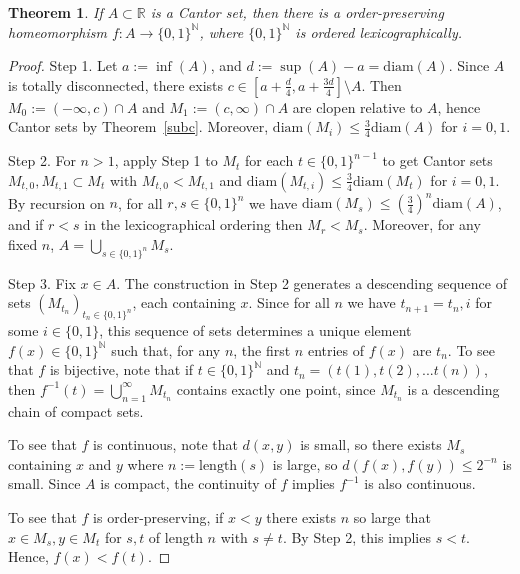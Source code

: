 \documentclass{article}
\newtheorem{theorem}{Theorem}
\newcommand{\length}{\mathrm{length}}
\newcommand{\N}{\mathbb{N}}
\begin{document}
\begin{theorem}\label{hom}
If $A \subset \mathbb{R}$ is a Cantor set, then there is a order-preserving homeomorphism $f:A \rightarrow {\{0,1\}}^\mathbb{N}$, where $\{0,1\}^\N$ is ordered lexicographically.
\end{theorem}
\begin{proof}
Step 1. Let $a := \inf (A)$, and $d := \sup (A) - a = \mathrm{diam}(A)$. Since $A$ is totally disconnected, there exists $c \in [a + \frac d 4, a + \frac {3d} 4] \setminus A$. Then $M_0 := (-\infty, c) \cap A $ and $M_1 := (c, \infty) \cap A$ are clopen relative to $A$, hence Cantor sets by Theorem~\ref{subc}. Moreover, $\mathrm{diam}(M_i) \leq \frac 3 4 \mathrm{diam}(A)$ for $i = 0,1$.

Step 2. For $n > 1$, apply Step 1 to $M_t$ for each $t \in {\{0,1\}}^{n-1}$ to get Cantor sets $M_{t,0}, M_{t,1} \subset M_t$ with $M_{t,0} < M_{t,1}$ and $\mathrm{diam}(M_{t,i}) \leq \frac 3 4 \mathrm{diam}(M_t)$ for $i=0,1$. By recursion on $n$, for all $r,s \in {\{0,1\}}^n$ we have $\mathrm{diam}(M_s) \leq \left(\frac 3 4\right)^n \mathrm{diam} (A)$, and if $r < s$ in the lexicographical ordering then $M_r < M_s$. Moreover, for any fixed $n$, $A = \bigcup_{s \in {\{0,1\}}^n} M_s$.

Step 3. Fix $x \in A$. The construction in Step 2 generates a descending sequence of sets ${\left(M_{t_n}\right)}_{t_n \in {\{0,1\}}^n}$, each containing $x$. Since for all $n$ we have $t_{n+1} =t_n,i$ for some $i \in \{0,1\}$, this sequence of sets determines a unique element $f(x) \in {\{0,1\}}^\mathbb{N}$ such that, for any $n$, the first $n$ entries of $f(x)$ are $t_n$. To see that $f$ is bijective, note that if $t \in {\{0,1\}}^\mathbb{N}$ and $t_n = (t(1), t(2), ... t(n))$, then $f^{-1}(t) = \bigcup_{n = 1}^\infty {M_{t_n}}$ contains exactly one point, since $M_{t_n}$ is a descending chain of compact sets.

To see that $f$ is continuous, note that $d(x,y)$ is small, so there exists $M_s$ containing $x$ and $y$ where $n := \length(s)$ is large, so $d(f(x), f(y)) \leq 2^{-n}$ is small. Since $A$ is compact, the continuity of $f$ implies $f^{-1}$ is also continuous.

To see that $f$ is order-preserving, if $x < y$ there exists $n$ so large that $x \in M_s, y \in M_t$ for $s,t$ of length $n$ with $s \neq t$. By Step 2, this implies $s < t$.
Hence, $f(x) < f(t)$.
\end{proof}
\end{document}
